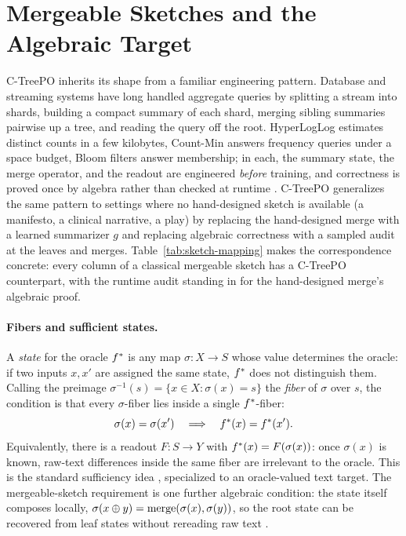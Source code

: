 \section{Mergeable Sketches and the Algebraic Target}\label{sec:mergeable-sketches}

C-TreePO inherits its shape from a familiar engineering pattern. Database
and streaming systems have long handled aggregate queries by splitting a
stream into shards, building a compact summary of each shard, merging
sibling summaries pairwise up a tree, and reading the query off the root.
HyperLogLog estimates distinct counts in a few kilobytes, Count-Min
answers frequency queries under a space budget, Bloom filters answer
membership; in each, the summary state, the merge operator, and the
readout are engineered \emph{before} training, and correctness is proved
once by algebra rather than checked at runtime
\citep{Agarwal2013MergeableTODS,FlajoletEtAl2007,CormodeMuthukrishnan2005}.
C-TreePO generalizes the same pattern to settings where no hand-designed
sketch is available (a manifesto, a clinical narrative, a play) by
replacing the hand-designed merge with a learned summarizer $g$ and
replacing algebraic correctness with a sampled audit at the leaves and
merges. Table~\ref{tab:sketch-mapping} makes the
correspondence concrete: every column of a classical mergeable sketch
has a C-TreePO counterpart, with the runtime audit standing in for the
hand-designed merge's algebraic proof.

\paragraph{Fibers and sufficient states.}
A \emph{state} for the oracle $f^\ast$ is any map $\sigma:X\to S$
whose value determines the oracle: if two inputs $x,x'$ are assigned
the same state, $f^\ast$ does not distinguish them. Calling the
preimage $\sigma^{-1}(s)=\{x\in X:\sigma(x)=s\}$ the \emph{fiber} of
$\sigma$ over $s$, the condition is that every $\sigma$-fiber lies
inside a single $f^\ast$-fiber:
\[
    \sigma(x)=\sigma(x') \quad\Longrightarrow\quad
    f^\ast(x)=f^\ast(x').
\]
Equivalently, there is a readout $F:S\to Y$ with
$f^\ast(x)=F(\sigma(x))$: once $\sigma(x)$ is known, raw-text
differences inside the same fiber are irrelevant to the oracle. This
is the standard sufficiency idea
\citep{Fisher1922,Blackwell1953,Kallenberg2002FMP}, specialized to an
oracle-valued text target. The mergeable-sketch requirement is one
further algebraic condition: the state itself composes locally,
$\sigma(x\oplus y)=\mathrm{merge}(\sigma(x),\sigma(y))$, so the root
state can be recovered from leaf states without rereading raw text
\citep{Agarwal2013MergeableTODS}.

